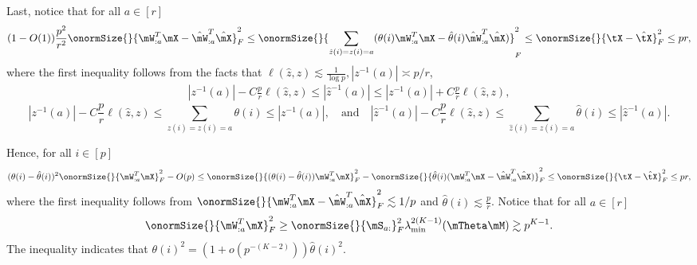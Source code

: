 \documentclass[lettersize,onecolumn,journal]{IEEEtran}
\theoremstyle{definition}
\theoremstyle{definition}
\begin{document}
{Last, notice that for all $a \in [r]$
\begin{align}
    (1 - O(1)) \frac{p^2}{r^2}\onormSize{}{\mW_{:a}^T \mX - \hat \mW_{:a}^T \hat \mX}_F^2 \leq  \onormSize{}{ \sum_{\hat z(i) = z(i) = a} (\theta(i) \mW_{:a}^T \mX  - \hat \theta(i) \hat \mW_{:a}^T \hat \mX)}_F^2 \leq \onormSize{}{\tX - \hat \tX}_F^2 \leq p r,
\end{align}
where the first inequality follows from the facts that  $\ell(\hat z, z) \lesssim \frac{1}{\log p}, |z^{-1}(a)| \asymp p /r$, 
\begin{align}
     | z^{-1}(a)| - C \frac{p}{r} \ell(\hat z, z)  \leq |\hat z^{-1}(a)| \leq | z^{-1}(a)| + C \frac{p}{r} \ell(\hat z, z), 
\end{align}
\begin{equation}
  | z^{-1}(a)|  - C \frac{p}{r} \ell( \hat z,z)  \leq \sum_{ z(i) = z(i) = a} \theta(i) \leq | z^{-1}(a)|, \quad \text{and} \quad |\hat z^{-1}(a)|  - C \frac{p}{r} \ell(\hat z, z)  \leq \sum_{\hat z(i) = z(i) = a} \hat \theta(i) \leq |\hat z^{-1}(a)|.
\end{equation}

Hence, for all $i \in [p]$
\begin{align}\label{eq:theta_hat}
  (\theta(i) - \hat \theta(i))^2 \onormSize{}{ \mW_{:a}^T \mX }_F^2 - O(p) \leq  \onormSize{}{ (\theta(i) - \hat \theta(i))\mW_{:a}^T \mX }_F^2 - \onormSize{}{ \hat \theta(i) (\mW_{:a}^T \mX - \hat \mW_{:a}^T \hat \mX) }_F^2 \leq \onormSize{}{\tX - \hat \tX}_F^2 \leq p r,
\end{align}
where the first inequality follows from $\onormSize{}{\mW_{:a}^T \mX - \hat \mW_{:a}^T \hat \mX}_F^2 \lesssim 1/p$ and $\hat \theta(i) \lesssim \frac{p}{r}$. Notice that for all $a \in [r]$
\begin{equation}
    \onormSize{}{\mW_{:a}^T \mX}_F^2 \geq \onormSize{}{\mS_{a:}}_F^2 \lambda_{\min}^{2(K-1)}(\mTheta \mM) \gtrsim p^{K-1}.
\end{equation}
The inequality indicates that $\theta(i)^2 = (1 + o(p^{-(K-2)})) \hat \theta(i)^2$. 


}


 
\end{document}

